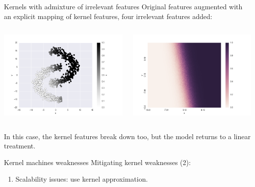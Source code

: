 \documentclass[11pt]{beamer}
\begin{document}
\begin{frame}{Kernels with admixture of irrelevant features}
Original features augmented with an explicit mapping of kernel features, four irrelevant features added:
\begin{columns}
\includegraphics[scale=0.3]{kernel_dim_scale_4_lin.png} 

\includegraphics[scale=0.3]{kernel_dim_scale_4_hp_lin.png} 
\end{columns}
In this case, the kernel features break down too, but the model returns to a linear treatment.
\end{frame}

\begin{frame}{Kernel machines weaknesses}
Mitigating kernel weaknesses (2):
\begin{enumerate}
\item Scalability issues: use kernel approximation.
\end{enumerate}
\end{frame}
\end{document}
